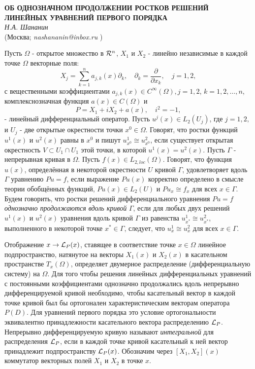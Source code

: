 \begin{center}{ \bf  ОБ ОДНОЗНАЧНОМ ПРОДОЛЖЕНИИ РОСТКОВ РЕШЕНИЙ ЛИНЕЙНЫХ УРАВНЕНИЙ ПЕРВОГО ПОРЯДКА}\\
{\it Н.А. Шананин } \\
(Москва; {\it nashananin@inbox.ru} )
\end{center}



Пусть $ \Omega$ - открытое множество в ${\cal R}^n$, $X_1$ и $X_2$ - линейно независимые в каждой точке $ \Omega$ векторные поля:
$$
X_j=\sum_{k=1}^na_{j, k}(x)\partial_k,\quad \partial_k=\frac{\partial}{\partial x_k},\quad j=1,2,
$$
с вещественными  коэффициентами $a_{j,k}(x)\in C^{\infty}(\Omega), j=1,2$, $k=1, 2,\dots, n$, комплекснозначная  функция $a(x)\in C(\Omega)$ и
$$
P=X_1+iX_2+a(x), \quad i^2=-1,
$$
- линейный дифференциальный оператор. Пусть $u^j(x)\in L_{2}(U_j)$, где $j=1, 2,$ и $U_j$ - две открытые окрестности точки  $x^0\in \Omega$. Говорят, что ростки  функций $u^1(x)$ и  $u^2(x)$  равны в $x^0$ и пишут  $u_{x^0}^1\cong u_{x^0}^2$, если существует открытая окрестность $V\subset U_1\cap U_1$ этой точки, в которой $u^1(x)=u^2(x)$. Пусть $\Gamma$ - непрерывная кривая в $ \Omega$. Пусть $f(x)\in L_{2, loc}(\Omega)$. Говорят, что функция $u(x)$, определённая в некоторой окрестности $U$ кривой $\Gamma$,  удовлетворяет вдоль $\Gamma$
 уравнению $Pu=f$, если выражение $Pu(x)$ корректно определено в смысле теории обобщённых функций, $Pu(x)\in L_{2}(U)$ и  $Pu_x\cong f_x$ для всех $x\in\Gamma$.
Будем говорить, что ростки решений дифференциального уравнения
$
Pu=f
$
{\it однозначно продолжаются вдоль кривой} $\Gamma$, если для любых двух решений $u^1(x)$ и $u^2(x)$ уравнения вдоль кривой $\Gamma$  из равенства $u^1_{x^{\ast}}\cong u^2_{x^{\ast}}$, выполненного в некоторой точке $x^{\ast}\in\Gamma$,   следует, что $u^1_x\cong u^2_x$ для всех $x\in\Gamma$.

Отображение $x\to {\cal L}_P(x)$, ставящее в соответствие точке $x\in \Omega$
линейное подпространство, натянутое на векторы $X_1(x)$ и $X_2(x)$ в касательном пространстве  $T_x(\Omega)$, определяет двумерное  распределение (дифференциальную систему) на $\Omega$.
Для того чтобы решения линейных дифференциальных уравнений с постоянными коэффициентами
однозначно продолжались вдоль непрерывно дифференцируемой кривой необходимо, чтобы касательный вектор в каждой точке кривой был бы ортогонален характеристическим векторам оператора $P(D)$. Для уравнений первого порядка это условие ортогональности эквивалентно принадлежности касательного вектора распределению ${\cal L}_P$.
Непрерывно дифференцируемую кривую называют {\it интегральной}  для распределения ${\cal L}_P$, если в каждой точке  кривой
касательный  к ней  вектор принадлежит подпространству ${\cal L}_P(x)$.
Обозначим через $[X_1, X_2](x)$ коммутатор векторных полей $X_1$ и $X_2$ в точке $x$.

